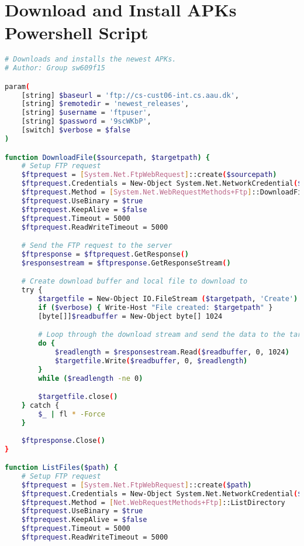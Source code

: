 \chapter{Download and Install APKs Powershell Script}\label{app:download_and_install_apks_windows}
\begin{lstlisting}[language=bash,caption=Powershell script that downloads and installs newest APKs,label=lst:download_install_apks_windows]
# Downloads and installs the newest APKs.
# Author: Group sw609f15

param(
    [string] $baseurl = 'ftp://cs-cust06-int.cs.aau.dk',
    [string] $remotedir = 'newest_releases',
    [string] $username = 'ftpuser',
    [string] $password = '9scWKbP',
    [switch] $verbose = $false
)

function DownloadFile($sourcepath, $targetpath) {
    # Setup FTP request
    $ftprequest = [System.Net.FtpWebRequest]::create($sourcepath)
    $ftprequest.Credentials = New-Object System.Net.NetworkCredential($username, $password)
    $ftprequest.Method = [System.Net.WebRequestMethods+Ftp]::DownloadFile
    $ftprequest.UseBinary = $true
    $ftprequest.KeepAlive = $false
    $ftprequest.Timeout = 5000
    $ftprequest.ReadWriteTimeout = 5000

    # Send the FTP request to the server
    $ftpresponse = $ftprequest.GetResponse()
    $responsestream = $ftpresponse.GetResponseStream()

    # Create download buffer and local file to download to
    try {
        $targetfile = New-Object IO.FileStream ($targetpath, 'Create')
        if ($verbose) { Write-Host "File created: $targetpath" }
        [byte[]]$readbuffer = New-Object byte[] 1024

        # Loop through the download stream and send the data to the target file
        do {
            $readlength = $responsestream.Read($readbuffer, 0, 1024)
            $targetfile.Write($readbuffer, 0, $readlength)
        }
        while ($readlength -ne 0)

        $targetfile.close()
    } catch {
        $_ | fl * -Force
    }
    
    $ftpresponse.Close()
}

function ListFiles($path) {
    # Setup FTP request
    $ftprequest = [System.Net.FtpWebRequest]::create($path)
    $ftprequest.Credentials = New-Object System.Net.NetworkCredential($username, $password)
    $ftprequest.Method = [Net.WebRequestMethods+Ftp]::ListDirectory
    $ftprequest.UseBinary = $true
    $ftprequest.KeepAlive = $false
    $ftprequest.Timeout = 5000
    $ftprequest.ReadWriteTimeout = 5000


\end{lstlisting}
